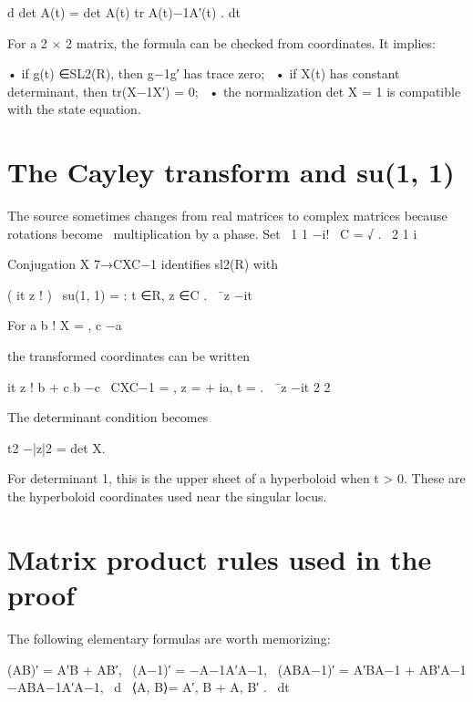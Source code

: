 d det A(t) = det A(t) tr A(t)−1A′(t) . dt


For a 2 × 2 matrix, the formula can be checked from coordinates. It implies:


\begin{displaytext}
• if g(t) ∈SL2(R), then g−1g′ has trace zero; \
• if X(t) has constant determinant, then tr(X−1X′) = 0; \
• the normalization det X = 1 is compatible with the state equation.
\end{displaytext}

\section{The Cayley transform and su(1, 1)}

\begin{displaytext}
The source sometimes changes from real matrices to complex matrices because rotations become \
multiplication by a phase. Set \
1 1 −i! \
C = √ . \
2 1 i
\end{displaytext}

Conjugation X 7→CXC−1 identifies sl2(R) with


\begin{displaytext}
( it z ! ) \
su(1, 1) = : t ∈R, z ∈C . \
¯z −it
\end{displaytext}

For a b ! X = , c −a


the transformed coordinates can be written


\begin{displaytext}
it z ! b + c b −c \
CXC−1 = , z = + ia, t = . \
¯z −it 2 2
\end{displaytext}

The determinant condition becomes


t2 −|z|2 = det X.


For determinant 1, this is the upper sheet of a hyperboloid when t > 0. These are the hyperboloid coordinates used near the singular locus.


\section{Matrix product rules used in the proof}

The following elementary formulas are worth memorizing:


\begin{displaytext}
(AB)′ = A′B + AB′, \
(A−1)′ = −A−1A′A−1, \
(ABA−1)′ = A′BA−1 + AB′A−1 −ABA−1A′A−1, \
d \
⟨A, B⟩= A′, B + A, B′ . \
dt
\end{displaytext}

